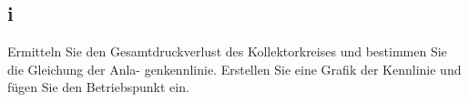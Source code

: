 \subsection{i}
Ermitteln Sie den Gesamtdruckverlust des Kollektorkreises und bestimmen Sie die Gleichung der Anla-
genkennlinie. Erstellen Sie eine Grafik der Kennlinie und fügen Sie den Betriebspunkt ein.